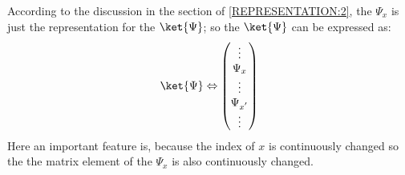 According to the discussion in the section of \ref{REPRESENTATION:2},
the $\Psi_{x}$ is just the representation for the $\ket{\Psi}$; so the
$\ket{\Psi}$ can be expressed as:
\begin{equation}
  \label{PRAMReq:16}
  \ket{\Psi} \Leftrightarrow \begin{pmatrix}
                               \vdots \\
                               \Psi_{x} \\
                               \vdots \\
                               \Psi_{x^{'}} \\
                               \vdots \\
                             \end{pmatrix}
\end{equation}
Here an important feature is, because the index of $x$ is continuously
changed so the the matrix element of the $\Psi_{x}$ is also continuously
changed.

